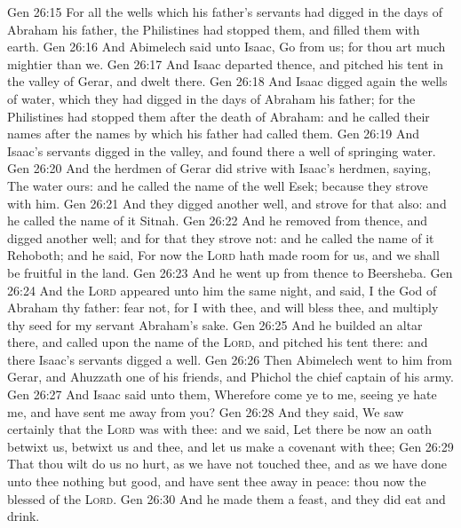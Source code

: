 \vs Gen 26:15 For all the wells which his father's servants had digged in the days of Abraham his father, the Philistines had stopped them, and filled them with earth.
\vs Gen 26:16 And Abimelech said unto Isaac, Go from us; for thou art much mightier than we.
\vs Gen 26:17 And Isaac departed thence, and pitched his tent in the valley of Gerar, and dwelt there.
\vs Gen 26:18 And Isaac digged again the wells of water, which they had digged in the days of Abraham his father; for the Philistines had stopped them after the death of Abraham: and he called their names after the names by which his father had called them.
\vs Gen 26:19 And Isaac's servants digged in the valley, and found there a well of springing water.
\vs Gen 26:20 And the herdmen of Gerar did strive with Isaac's herdmen, saying, The water  ours: and he called the name of the well Esek; because they strove with him.
\vs Gen 26:21 And they digged another well, and strove for that also: and he called the name of it Sitnah.
\vs Gen 26:22 And he removed from thence, and digged another well; and for that they strove not: and he called the name of it Rehoboth; and he said, For now the \textsc{Lord} hath made room for us, and we shall be fruitful in the land.
\vs Gen 26:23 And he went up from thence to Beersheba.
\vs Gen 26:24 And the \textsc{Lord} appeared unto him the same night, and said, I  the God of Abraham thy father: fear not, for I  with thee, and will bless thee, and multiply thy seed for my servant Abraham's sake.
\vs Gen 26:25 And he builded an altar there, and called upon the name of the \textsc{Lord}, and pitched his tent there: and there Isaac's servants digged a well.
\vs Gen 26:26 Then Abimelech went to him from Gerar, and Ahuzzath one of his friends, and Phichol the chief captain of his army.
\vs Gen 26:27 And Isaac said unto them, Wherefore come ye to me, seeing ye hate me, and have sent me away from you?
\vs Gen 26:28 And they said, We saw certainly that the \textsc{Lord} was with thee: and we said, Let there be now an oath betwixt us,  betwixt us and thee, and let us make a covenant with thee;
\vs Gen 26:29 That thou wilt do us no hurt, as we have not touched thee, and as we have done unto thee nothing but good, and have sent thee away in peace: thou  now the blessed of the \textsc{Lord}.
\vs Gen 26:30 And he made them a feast, and they did eat and drink.
